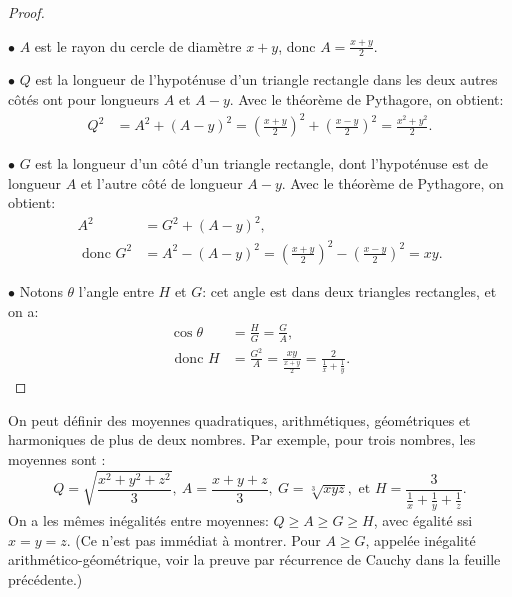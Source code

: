 \begin{proof}
\begin{center}
\end{center}

$\bullet$ $A$ est le rayon du cercle de diamètre $x+y$, donc $A=\frac{x+y}2$.

$\bullet$ $Q$ est la longueur de l'hypoténuse d'un triangle rectangle dans les deux autres côtés ont pour longueurs $A$ et $A-y$. Avec le théorème de Pythagore, on obtient:
\begin{align*}
Q^2 & = A^2 +(A-y)^2 = \left( \frac{x+y}2\right)^2+\left( \frac{x-y}2\right)^2= \frac{x^2+y^2}2.
\end{align*}

$\bullet$ $G$ est la longueur d'un côté d'un triangle rectangle, dont l'hypoténuse est de longueur $A$ et l'autre côté de longueur $A-y$. Avec le théorème de Pythagore, on obtient:
\begin{align*}
A^2 & = G^2 +(A-y)^2, \\
\text{ donc } G^2 & = A^2 - (A-y)^2= \left( \frac{x+y}2\right)^2-\left( \frac{x-y}2\right)^2=xy.
\end{align*}

$\bullet$ Notons $\theta$ \og{}l'angle entre $H$ et $G$\fg{}: cet angle est dans deux triangles rectangles, et on a:
\begin{align*}
\cos \theta & =\frac{H}{G}=\frac{G}{A}, \\
\text{ donc } H & = \frac{G^2}A= \frac{xy}{\frac{x+y}2}=\frac{2}{\frac1x+\frac1y}.
\end{align*}
\end{proof}


On peut définir des moyennes quadratiques, arithmétiques, géométriques et harmoniques de plus de deux nombres. Par exemple, pour trois nombres, les moyennes sont :
\[ Q = \sqrt{\frac{x^2+y^2+z^2}{3}},
\:
A = \frac{x+y+z}{3},
\:
G = \sqrt[3]{xyz},
\text{ et }
H = \frac{3}{\frac1x+\frac1y+\frac1z}.\]
On a les mêmes inégalités entre moyennes: $Q\geq A\geq G\geq H$, avec égalité ssi $x=y=z$. (Ce n'est pas immédiat à montrer. Pour $A\geq G$, appelée inégalité arithmético-géométrique, voir la preuve par \og récurrence de Cauchy\fg{} dans la feuille précédente.)

